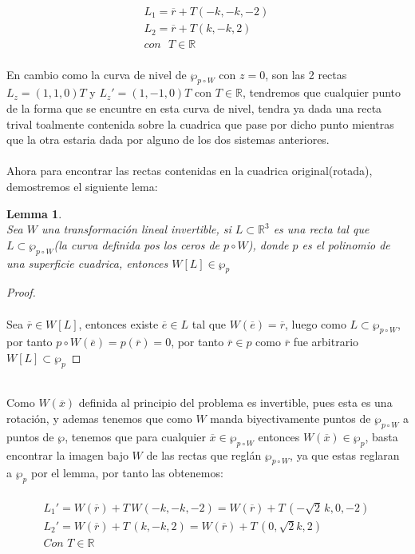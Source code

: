 \documentclass[11pt,letterpaper]{article}
\newtheorem{lemma}[theorem]{Lemma}
\newcommand{\R}{\mathbb{R}}
\begin{document}
        \begin{align*}
            L_1=\overline{r}+T(-k,-k,-2)\,\\
            L_2=\overline{r}+T(k,-k,2)\,\\
            con\,\,\,\,T\in \R
        \end{align*}\,\\
        En cambio como la curva de nivel de $\wp_{p\circ W}$ con $z=0$, son las 2 rectas $L_z=(1,1,0)T$ y $L_{z}'=(1,-1,0)T$ con $T\in \R$, tendremos que cualquier punto
        de la forma que se encuntre en esta curva de nivel, tendra ya dada una recta trival toalmente contenida sobre la cuadrica que pase por dicho punto
        mientras que la otra estaria dada por alguno de los dos sistemas anteriores.\,\\
        \,\\
        Ahora para encontrar las rectas contenidas en la cuadrica original(rotada), demostremos el siguiente lema:\,\\
        \begin{lemma}\,\\
            Sea $W$ una transformaci\'on lineal invertible, si $L\subset \R^3$ es una recta tal que $L\subset \wp_{p\circ W}$(la curva definida pos los ceros de $p\circ W$), donde $p$ es el polinomio de una superficie cuadrica, entonces $W[L]\in \wp_{p}$ 
        \end{lemma}
        \begin{proof}\,\\
            \,\\
            Sea $\overline{r}\in W[L]$, entonces existe $\overline{e}\in L$ tal que $W(\overline{e})=\overline{r}$, luego como $L\subset\wp_{ p\circ W}$, por tanto $p\circ W(\overline{e})=p(\overline{r})=0$, por tanto
            $\overline{r}\in p$ como $\overline r$ fue arbitrario $W[L]\subset \wp_{p}$
        \end{proof}\,\\
        Como $W(\overline{x})$ definida al principio del problema es invertible, pues esta es una rotaci\'on, y ademas tenemos que como $W$ manda biyectivamente puntos de $\wp_{p\circ W}$ a puntos de $\wp$, tenemos que para cualquier $\overline{x}\in \wp_{p\circ W}$ entonces
        $W(\overline{x})\in \wp_{p}$, basta encontrar la imagen bajo $W$ de las rectas que regl\'an $\wp_{p\circ W}$, ya que estas reglaran a $\wp_{p}$ por el lemma, por tanto las obtenemos:\,\\
        \,\\
        \begin{align*}
            L_1'=W(\overline{r})+T\,W(-k,-k,-2)=W(\overline{r})+T\,(-\sqrt{2}\,k,0,-2)\,\\
            L_2'=W(\overline{r})+T\,(k,-k,2)=W(\overline{r})+T\,(0,\sqrt{2}k,2)\,\\
            Con\,\,T\in \R
        \end{align*}\,\\
\end{document}
